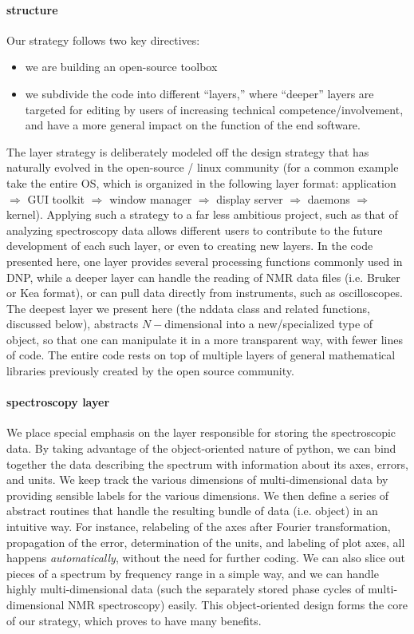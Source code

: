\paragraph{structure}
Our strategy follows two key directives:
\begin{itemize}
    \item we are building an open-source toolbox
    \item we subdivide the code into different ``layers,'' where ``deeper'' layers are targeted for editing by users of increasing technical competence/involvement, and have a more general impact on the function of the end software.
\end{itemize}
The layer strategy is deliberately modeled off the
    design strategy that has naturally evolved
    in the open-source / linux community
    (for a common example
    take the entire OS, which is organized in the following layer format:
    application $\Rightarrow$ GUI toolkit $\Rightarrow$ window manager $\Rightarrow$ display server $\Rightarrow$ daemons $\Rightarrow$ kernel).
Applying such a strategy to a far less ambitious
    project, such as that of analyzing spectroscopy data
    allows different users to contribute to the future development
    of each such layer, or even to creating new layers.
In the code presented here,
    one layer provides several processing functions commonly used in DNP,
    while a deeper layer can handle the reading of NMR data files (i.e. Bruker or Kea format),
    or can pull data directly from instruments,
    such as oscilloscopes.
The deepest layer we present 
    here (the nddata class and related functions,
    discussed below),
    abstracts $N-$dimensional into 
    a new/specialized type of object,
    so that one can manipulate it in a more
    transparent way, with fewer lines of code.
The entire code rests on top of multiple layers
    of general mathematical libraries previously created by the open
    source community.
\paragraph{spectroscopy layer}
We place special emphasis on the layer responsible for
    storing the spectroscopic data.
By taking advantage of the object-oriented nature of python,
    we can bind together the data describing the spectrum
    with information about its axes, errors, and units.
We keep track the various dimensions of multi-dimensional data
    by providing sensible labels for the various dimensions.
We then define a series of abstract routines that handle the resulting
    bundle of data (i.e. object) in an intuitive way.
For instance, relabeling of the axes after Fourier transformation,
    propagation of the error,
    determination of the units,
    and labeling of plot axes,
    all happens {\it automatically},
    without the need for further coding.
We can also slice out pieces of a spectrum by frequency range in a simple way,
    and we can handle highly multi-dimensional data
    (such the separately stored phase cycles of multi-dimensional NMR spectroscopy)
    easily.
This object-oriented design forms the core of our strategy,
    which proves to have many benefits.

